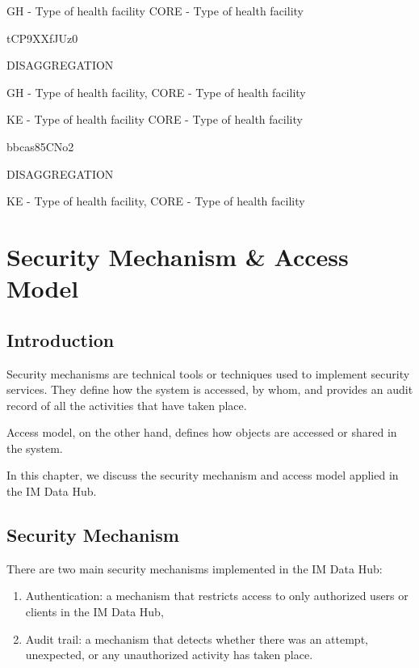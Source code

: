 \documentclass[]{book}
\providecommand{\tightlist}{%
  \setlength{\itemsep}{0pt}\setlength{\parskip}{0pt}}
\begin{document}
GH - Type of health facility \textbar{} CORE - Type of health facility

tCP9XXfJUz0

DISAGGREGATION

GH - Type of health facility, CORE - Type of health facility

KE - Type of health facility \textbar{} CORE - Type of health facility

bbcas85CNo2

DISAGGREGATION

KE - Type of health facility, CORE - Type of health facility

\hypertarget{access}{%
\chapter{Security Mechanism \& Access Model}\label{access}}

\hypertarget{introduction-3}{%
\section{Introduction}\label{introduction-3}}

Security mechanisms are technical tools or techniques used to implement security services. They define how the system is accessed, by whom, and provides an audit record of all the activities that have taken place.

Access model, on the other hand, defines how objects are accessed or shared in the system.

In this chapter, we discuss the security mechanism and access model applied in the IM Data Hub.

\hypertarget{security-mechanism}{%
\section{Security Mechanism}\label{security-mechanism}}

There are two main security mechanisms implemented in the IM Data Hub:

\begin{enumerate}
\def\labelenumi{\arabic{enumi}.}
\tightlist
\item
  Authentication: a mechanism that restricts access to only authorized users or clients in the IM Data Hub,
\item
  Audit trail: a mechanism that detects whether there was an attempt, unexpected, or any unauthorized activity has taken place.
\end{enumerate}
\end{document}
